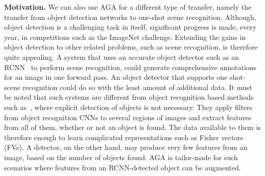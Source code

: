 \documentclass[10pt,twocolumn,letterpaper]{article}
\begin{document}
\begin{table}[t!]
\small
{}
\caption{\label{table:oneshot_scenes} \footnotesize{
\textit{One-shot scene classification} on a set of 25 Indoor scene classes
\cite{dset:MITIndoor}: \{auditorium, bakery, bedroom, bookstore, children room, classroom, computer room, concert hall, corridor, dental office, dining room, hospital room, laboratory, library, living room, lobby, meeting room, movie theater, nursery, office, operating room, pantry, restaurant\}}.}
\end{table}

\noindent
\textbf{Motivation.} We can also use AGA for a different type of 
transfer, namely the transfer from object detection networks to 
one-shot scene recognition. Although, object detection is a challenging 
task in itself, significant progress is made, every year, 
in competitions such as the ImageNet challenge. Extending the gains 
in object detection to other related problems, such as scene recognition, 
is therefore quite appealing. A system that uses 
an accurate object detector such as an RCNN~\cite{Girshick15a} to perform 
scene recognition, could generate comprehensive annotations for an 
image in one forward pass. An object detector that supports one shot-scene 
recognition could do so with the least amount of additional data. 
It must be noted that such systems are different from object recognition 
based methods such as~\cite{Gong14a,Dixit15a,Cimpoi15a}, where explicit 
detection of objects is not necessary. They apply filters from object 
recognition CNNs to several regions of images and extract features from 
all of them, whether or not an object is found. The data available to 
them is therefore enough to learn complicated representations 
such as Fisher vectors (FVs). A detector, on the other hand, may produce 
very few features from an image, based on the number of objects found. 
AGA is tailor-made for such scenarios where 
features from an RCNN-detected object can be augmented.
\end{document}
